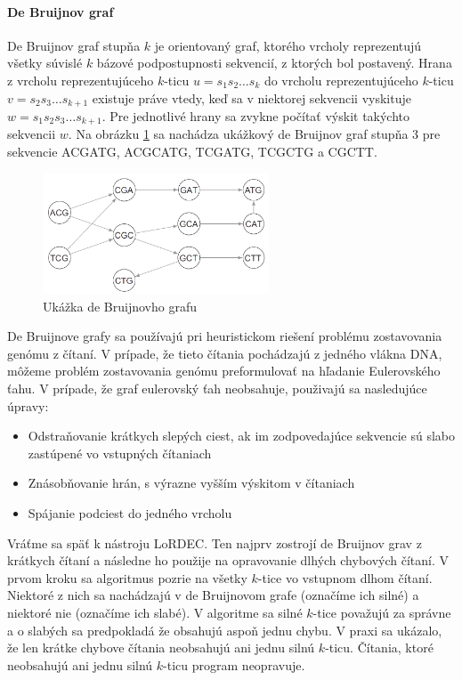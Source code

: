 \paragraph{De Bruijnov graf}

De Bruijnov graf stupňa $k$ je orientovaný graf, ktorého vrcholy reprezentujú všetky súvislé $k$ bázové podpostupnosti sekvencií, z ktorých bol postavený. Hrana z vrcholu reprezentujúceho $k$-ticu $u = s_{1}s_{2}\dots s_{k}$ do vrcholu reprezentujúceho $k$-ticu $v = s_{2}s_{3}\dots s_{k + 1}$ existuje práve vtedy, keď sa v niektorej sekvencii vyskituje $w = s_{1}s_{2}s_{3}\dots s_{k + 1}$. Pre jednotlivé hrany sa zvykne počítať výskit takýchto sekvencii $w$. Na obrázku \ref{fig:debruijngraph} sa nachádza ukážkový de Bruijnov graf stupňa 3 pre sekvencie ACGATG, ACGCATG, TCGATG, TCGCTG a CGCTT. 

\begin{figure}
    \centering
    \includegraphics[width=0.6\textwidth]{images/debruijn.png}
    \caption{Ukážka de Bruijnovho grafu}
    \label{fig:debruijngraph}
\end{figure}

De Bruijnove grafy sa používajú pri heuristickom riešení problému zostavovania genómu z čítaní. V prípade, že tieto čítania pochádzajú z jedného vlákna DNA, môžeme problém zostavovania genómu preformulovať na hľadanie Eulerovského ťahu. V prípade, že graf eulerovský ťah neobsahuje, použivajú sa nasledujúce úpravy:
\begin{itemize}
\item Odstraňovanie krátkych slepých ciest, ak im zodpovedajúce sekvencie sú slabo zastúpené vo vstupných čítaniach
\item Znásobňovanie hrán, s výrazne vyšším výskitom v čítaniach
\item Spájanie podciest do jedného vrcholu
\end{itemize}

Vráťme sa späť k nástroju LoRDEC. Ten najprv zostrojí de Bruijnov grav z krátkych čítaní a následne ho použije na opravovanie dlhých chybových čítaní. V prvom kroku sa algoritmus pozrie na všetky $k$-tice vo vstupnom dlhom čítaní. Niektoré z nich sa nachádzajú v de Bruijnovom grafe (označíme ich silné) a niektoré nie (označíme ich slabé). V algoritme sa silné $k$-tice považujú za správne a o slabých sa predpokladá že obsahujú aspoň jednu chybu. V praxi sa ukázalo, že len krátke chybove čítania neobsahujú ani jednu silnú $k$-ticu. Čítania, ktoré neobsahujú ani jednu silnú $k$-ticu program neopravuje.

